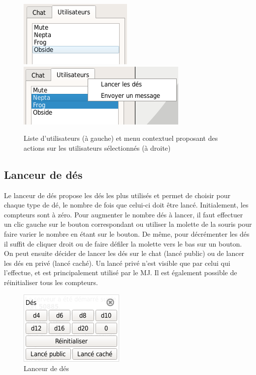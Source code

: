 \begin{figure}[h!]
	\centering
	\includegraphics[scale=0.5]{img/chat_userlist_1.png}
	\hspace{10 mm}
	\includegraphics[scale=0.5]{img/chat_userlist_2.png}
	\caption{Liste d'utilisateurs (à gauche) et menu contextuel proposant des actions sur les utilisateurs sélectionnés (à droite)}
\end{figure}
\newpage

\subsection{Lanceur de dés}
Le lanceur de dés propose les dés les plus utilisés et permet de choisir pour chaque type de dé, le nombre de fois que celui-ci doit être lancé. Initialement, les compteurs sont à zéro. Pour augmenter le nombre dés à lancer, il faut effectuer un clic gauche sur le bouton correspondant ou utiliser la molette de la souris pour faire varier le nombre en étant sur le bouton. De même, pour décrémenter les dés il suffit de cliquer droit ou de faire défiler la molette vers le bas sur un bouton. On peut ensuite décider de lancer les dés sur le chat (lancé public) ou de lancer les dés en privé (lancé caché). Un lancé privé n'est visible que par celui qui l'effectue, et est principalement utilisé par le MJ. Il est également possible de réinitialiser tous les compteurs.

\begin{figure}[h!]
	\centering
	\includegraphics[scale=0.5]{img/dice_manager.png}
	\caption{Lanceur de dés}
\end{figure}

